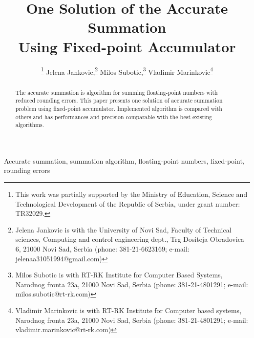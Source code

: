 \documentclass[conference]{IEEEtran}
\begin{document}
%
\title{One Solution of the Accurate Summation \\ Using Fixed-point Accumulator}


\author{
	\thanks{
		This work was partially supported by the Ministry of Education, 
		Science and Technological Development of the Republic of Serbia, 
		under grant number: TR32029.
	}
	Jelena Jankovic,\thanks{
		Jelena Jankovic is with the University of Novi Sad, Faculty of Technical sciences, 
		Computing and control engineering dept., 
		Trg Dositeja Obradovica 6, 21000 Novi Sad, Serbia
		(phone: 381-21-6623169; e-mail: jelenaa31051994@gmail.com)
	}
	Milos Subotic,\thanks{
		Milos Subotic is with RT-RK Institute for Computer Based Systems,
		Narodnog fronta 23a, 21000 Novi Sad, Serbia
		(phone: 381-21-4801291; e-mail: milos.subotic@rt-rk.com)
	}
	Vladimir Marinkovic\thanks{
		Vladimir Marinkovic is with RT-RK Institute for Computer based systems,
		Narodnog fronta 23a, 21000 Novi Sad, Serbia
		(phone: 381-21-4801291; e-mail: vladimir.marinkovic@rt-rk.com)
	}
}


\maketitle


\begin{abstract}
The accurate summation is algorithm for summing floating-point numbers with reduced rounding errors.
This paper presents one solution of accurate summation problem using fixed-point accumulator.
Implemented algorithm is compared with others
and has performances and precision comparable with the best existing algorithms.
\end{abstract}

\begin{IEEEkeywords}
Accurate summation, summation algorithm, floating-point numbers, fixed-point, rounding errors
\end{IEEEkeywords}




%
\IEEEpeerreviewmaketitle
\end{document}
